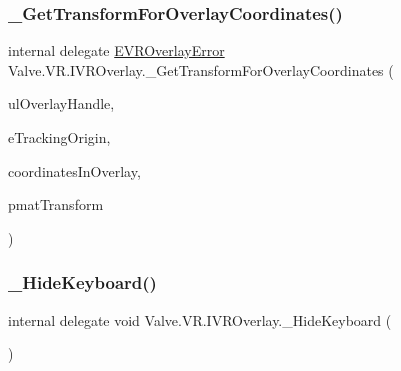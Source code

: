 \mbox{\label{struct_valve_1_1_v_r_1_1_i_v_r_overlay_a5b737a48531e2ce68c2dc7f2a6e374f9}} 
\subsubsection{\texorpdfstring{\_GetTransformForOverlayCoordinates()}{\_GetTransformForOverlayCoordinates()}}
{\footnotesize\ttfamily internal delegate \mbox{\hyperlink{namespace_valve_1_1_v_r_aaee5c5144f42b7969d45b854f51b0c18}{E\+V\+R\+Overlay\+Error}} Valve.\+V\+R.\+I\+V\+R\+Overlay.\+\_\+\+Get\+Transform\+For\+Overlay\+Coordinates (\begin{DoxyParamCaption}\item[{ulong}]{ul\+Overlay\+Handle,  }\item[{\mbox{\hyperlink{namespace_valve_1_1_v_r_a29be99a3c2f780157bd490db06a7f12f}{E\+Tracking\+Universe\+Origin}}}]{e\+Tracking\+Origin,  }\item[{\mbox{\hyperlink{struct_valve_1_1_v_r_1_1_hmd_vector2__t}{Hmd\+Vector2\+\_\+t}}}]{coordinates\+In\+Overlay,  }\item[{ref \mbox{\hyperlink{struct_valve_1_1_v_r_1_1_hmd_matrix34__t}{Hmd\+Matrix34\+\_\+t}}}]{pmat\+Transform }\end{DoxyParamCaption})}

\mbox{\label{struct_valve_1_1_v_r_1_1_i_v_r_overlay_acd7a1c9668b31dc428bd90a91d841841}} 
\subsubsection{\texorpdfstring{\_HideKeyboard()}{\_HideKeyboard()}}
{\footnotesize\ttfamily internal delegate void Valve.\+V\+R.\+I\+V\+R\+Overlay.\+\_\+\+Hide\+Keyboard (\begin{DoxyParamCaption}{ }\end{DoxyParamCaption})}

\mbox{\label{struct_valve_1_1_v_r_1_1_i_v_r_overlay_aa37a48da1e178713f92a56c045d5b50e}} 

